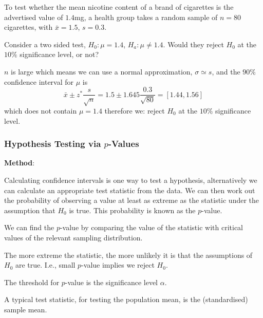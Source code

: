 \documentclass[10pt, a4paper]{article}
\begin{document}
\begin{example}[Nicotine]
     To test whether the mean nicotine content of a brand of cigarettes is the advertised value of $1.4$mg,
     a health group takes a random sample of $n = 80$ cigarettes,
     with $\bar{x} = 1.5$,
     $s = 0.3$.

     Consider a two sided test,
     $H_0 : \mu = 1.4$,
     $H_a : \mu \neq 1.4$.
     Would they reject $H_0$ at the $10\%$ significance level,
     or not?

     \begin{solution}
         $n$ is large which means we can use a normal approximation,
         $\sigma \simeq s$,
         and the $90\%$ confidence interval for $\mu$ is
         \[
         \bar{x} \pm z ^ {*}\frac{s}{\sqrt{n}} = 1.5 \pm 1.645\frac{0.3}{\sqrt{80}} = [1.44, 1.56]
         \]
         which does not contain $\mu = 1.4$ therefore we:
         reject $H_0$ at the $10\%$ significance level.
     \end{solution}
\end{example}

\subsubsection{Hypothesis Testing via \texorpdfstring{$p$}{}-Values}
\textbf{Method}:

\begin{definition}[$p$-value]
    Calculating confidence intervals is one way to test a hypothesis,
    alternatively we can calculate an appropriate test statistic from the data.
    We can then work out the probability of observing a value at least as extreme as the statistic under the assumption that $H_0$ is true.
    This probability is known as the $p$-value.
\end{definition}

We can find the $p$-value by comparing the value of the statistic with critical values of the relevant sampling distribution.

The more extreme the statistic,
the more unlikely it is that the assumptions of $H_0$ are true.
I.e.,
small $p$-value implies we reject $H_0$.

The threshold for $p$-value is the significance level $\alpha$.

A typical test statistic,
for testing the population mean,
is the
(standardised)
sample mean.
\end{document}
